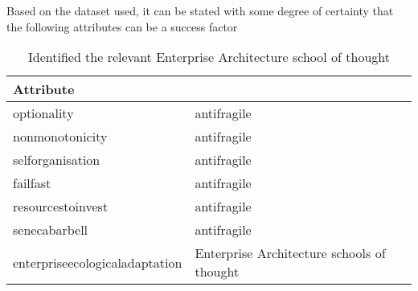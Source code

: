 Based on the dataset used, it can be stated with some degree of certainty that the following attributes can be a success factor

\begin{table}[!h]
	\begin{center}
			\begin{tabular}{@{}ll@{}}
				\textbf{Attribute} & \rotatebox{60}{\textbf{Type}} \\%
				\midrule%
				\Gls{optionality} & \Gls{antifragile} \\%
				\Gls{nonmonotonicity} & \Gls{antifragile} \\%
				\Gls{selforganisation} & \Gls{antifragile} \\%
				\Gls{failfast} & \Gls{antifragile} \\%
				\Gls{resourcestoinvest} & \Gls{antifragile} \\%
				\Gls{senecabarbell} & \Gls{antifragile} \\%
				\Gls{enterpriseecologicaladaptation} & Enterprise Architecture schools of thought \\%
				\bottomrule
			\end{tabular}
		\caption{Identified the relevant Enterprise Architecture school of thought}
	\end{center}
\end{table}

